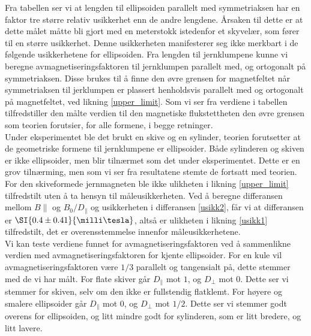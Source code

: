 \documentclass[%
 reprint,
nofootinbib,
aps,
]{revtex4-1}
\begin{document}
Fra tabellen ser vi at lengden til ellipsoiden parallelt med symmetriaksen har en faktor tre større relativ usikkerhet enn de andre lengdene. Årsaken til dette er at dette målet måtte bli gjort med en meterstokk istedenfor et skyvelær, som fører til en større usikkerhet. Denne usikkerheten manifesterer seg ikke merkbart i de følgende usikkerhetene for ellipsoiden. Fra lengden til jernklumpene kunne vi beregne avmagnetiseringsfaktoren til jernklumpen parallelt med, og ortogonalt på symmetriaksen. Disse brukes til å finne den øvre grensen for magnetfeltet når symmetriaksen til jerklumpen er plassert henholdsvis parallelt med og ortogonalt på magnetfeltet, ved likning \eqref{upper_limit}. Som vi ser fra verdiene i tabellen tilfredstiller den målte verdien til den magnetiske flukstettheten den øvre grensen som teorien forutsier, for alle formene, i begge retninger.\\
Under eksperimentet ble det brukt en skive og en sylinder, teorien forutsetter at de geometriske formene til jernklumpene er ellipsoider. Både sylinderen og skiven er ikke ellipsoider, men blir tilnærmet som det under eksperimentet. Dette er en grov tilnærming, men som vi ser fra resultatene stemte de fortsatt med teorien. For den skiveformede jernmagneten ble ikke ulikheten i likning \eqref{upper_limit} tilfredstilt uten å ta hensyn til måleusikkerheten. Ved å beregne differansen mellom $B\parallel$ og $B_0/D_{\parallel}$ og usikkerheten i differansen \eqref{usikk2}, får vi at differansen er $\SI{0.4\pm0.41}{\milli\tesla}$, altså er ulikheten i likning \eqref{usikk1} tilfredstilt, det er overensstemmelse innenfor måleusikkerhetene.\\
Vi kan teste verdiene funnet for avmagnetiseringsfaktoren ved å sammenlikne verdien med avmagnetiseringsfaktoren for kjente ellipsoider. For en kule vil avmagnetiseringsfaktoren være $1/3$ parallelt og tangensialt på, dette stemmer med de vi har målt. For flate skiver går $D_{\parallel}$ mot $1$, og $D_{\perp}$ mot $0$. Dette ser vi stemmer for skiven, selv om den ikke er fullstendig flatklemt. For høyere og smalere ellipsoider går $D_{\parallel}$ mot $0$, og $D_{\perp}$ mot $1/2$. Dette ser vi stemmer godt overens for ellipsoiden, og litt mindre godt for sylinderen, som er litt bredere, og litt lavere.
\par
\end{document}
